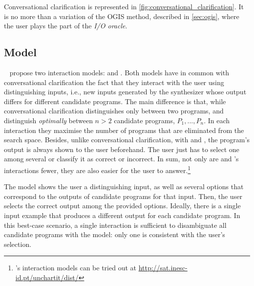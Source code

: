 Conversational clarification is represented in \autoref{fig:conversational_clarification}. It is no more than a variation of the \ac{OGIS} method, described in \autoref{sec:ogis}, where the user plays the part of the \textit{I/O oracle}.


\subsection{\optmodel Model}\label{sec:rel-ramos-interaction}

\citeauthor{UnchartIt20}~\cite{UnchartIt20,unchartit-webpage} propose two interaction models: \optmodel and \ynmodel.
Both models have in common with conversational clarification the fact that they interact with the user using distinguishing inputs, i.e., new inputs generated by the synthesizer whose output differs for different candidate programs. 
The main difference is that, while conversational clarification distinguishes only between two programs, \optmodel and \ynmodel distinguish \textit{optimally} between \(n > 2\) candidate programs, \(P_1, ..., P_n\).
In each interaction they maximise the number of programs that are eliminated from the search space. Besides, unlike conversational clarification, with \optmodel and \ynmodel, the program's output is always shown to the user beforehand.
The user just has to select one among several or classify it as correct or incorrect.
In sum, not only are \optmodel and \ynmodel's interactions fewer, they are also easier for the user to answer.\footnote{\UnchartIt's interaction models can be tried out at \url{http://sat.inesc-id.pt/unchartit/dist/}}

The \optmodel model shows the user a distinguishing input, as well as several options that correspond to the outputs of candidate programs for that input. Then, the user selects the correct output among the provided options.
Ideally, there is a single input example that produces a different output for each candidate program.
In this best-case scenario, a single interaction is sufficient to disambiguate all candidate programs with the \optmodel model: only one is consistent with the user's selection.

